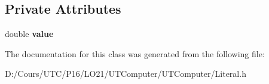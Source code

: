\subsection*{Private Attributes}
\begin{DoxyCompactItemize}
\item 
double {\bfseries value}\hypertarget{class_real_literal_afca7de8252199cca3a72405ad5e93443}{}\label{class_real_literal_afca7de8252199cca3a72405ad5e93443}

\end{DoxyCompactItemize}


The documentation for this class was generated from the following file\+:\begin{DoxyCompactItemize}
\item 
D\+:/\+Cours/\+U\+T\+C/\+P16/\+L\+O21/\+U\+T\+Computer/\+U\+T\+Computer/Literal.\+h\end{DoxyCompactItemize}
